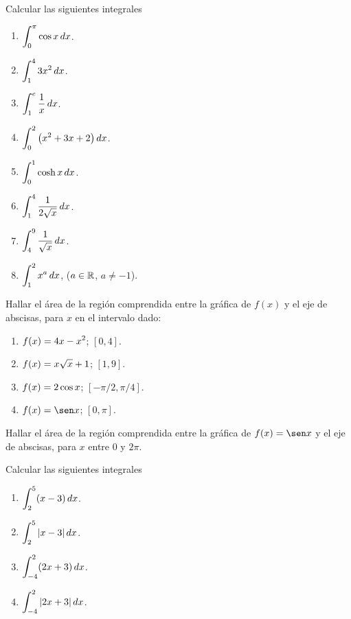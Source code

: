 \item Calcular las siguientes integrales
\begin{multicols}{2}
  \begin{enumerate}
    \item $\displaystyle \int_0^\pi \cos x \,dx$.
    \item $\displaystyle \int_1^4 3 x^2 \,dx$.
    \item $\displaystyle \int_1^e \frac1x \,dx$.
    \item $\displaystyle \int_0^2 \big( x^2+3x+2\big) \,dx$.
    \item $\displaystyle \int_0^1 \cosh x \,dx$.
    \item $\displaystyle \int_1^4 \frac{1}{2\sqrt{x}} \,dx$.
    \item $\displaystyle \int_4^9 \frac{1}{\sqrt x}\,dx$.
    \item $\displaystyle \int_1^2 x^a \,dx$, ($a\in \mathbb{R}$, $a\neq -1$).
  \end{enumerate}
\end{multicols}
\item Hallar el área de la región comprendida entre la gráfica de $f(x)$ y el eje de abscisas, para $x$ en el intervalo dado:
\begin{multicols}{2}
  \begin{enumerate}
    \item $\displaystyle f(x)=4x-x^2$; $[0,4]$.
    \item $\displaystyle f(x)=x\sqrt{x}+1$; $[1,9]$.
    \item $\displaystyle f(x)=2\cos x$; $[-\pi/2,\pi/4]$.
    \item $\D f(x)=\sen x$; $[0,\pi]$.
  \end{enumerate}
\end{multicols}

\item Hallar el área de la región comprendida entre la gráfica de $f(x)=\sen x$ y el eje de abscisas, para $x$ entre $0$ y $2\pi$.

\item Calcular las siguientes integrales
\begin{multicols}{2}
  \begin{enumerate}
    \item $\displaystyle \int_2^5 (x-3) \,dx$.
    \item $\displaystyle \int_2^5 |x-3| \,dx$.
    \item $\displaystyle \int_{-4}^2 (2x+3) \,dx$.
    \item $\displaystyle \int_{-4}^2 |2x+3| \,dx$.
  \end{enumerate}
\end{multicols}

